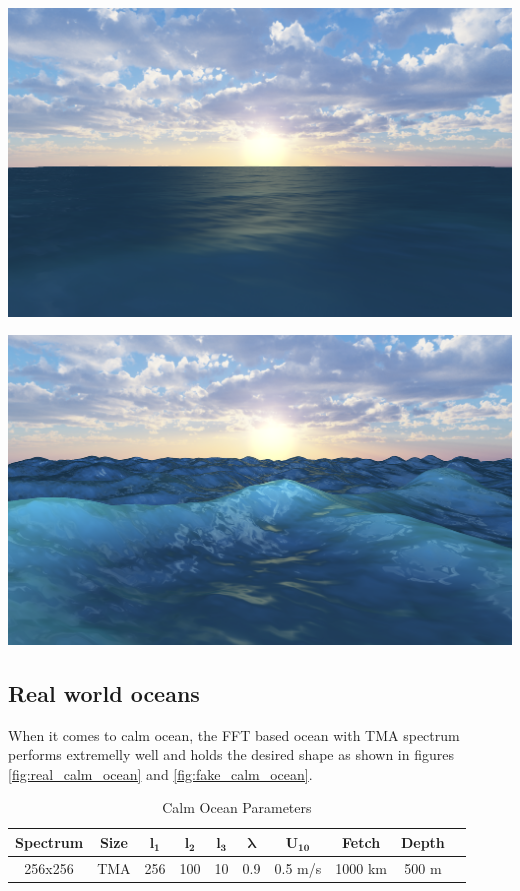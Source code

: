 \begin{minipage}{0.48\textwidth}
    \centering
    \includegraphics[width=1\textwidth]{"images/naive_calm.png"}
    \label{fig:naive_calm}
\end{minipage}
\hfill
\begin{minipage}{0.48\textwidth}
    \centering
    \includegraphics[width=1\textwidth]{"images/naive_storm.png"}
    \label{fig:naive_stormy}
\end{minipage}

\subsection{Real world oceans}
When it comes to calm ocean, the FFT based ocean with TMA spectrum performs extremelly well and holds the desired shape as shown in figures \ref{fig:real_calm_ocean} and \ref{fig:fake_calm_ocean}.
\begin{table}[h]
    \centering
    \begin{tabular}{|c|c|c|c|c|c|c|c|c|c|}
        \hline
        \textbf{Spectrum} & \textbf{Size} & $\mathbf{l_1}$ & $\mathbf{l_2}$ & $\mathbf{l_3}$ & $\mathbf{\lambda}$ & $\mathbf{U_{10}}$ & \textbf{Fetch} & \textbf{Depth} \\
        \hline
        256x256 & TMA & 256 & 100 & 10 & 0.9 & 0.5 m/s & 1000 km & 500 m \\
        \hline
    \end{tabular}
    \caption{Calm Ocean Parameters}
    \label{tab:calm_ocean}
\end{table}

